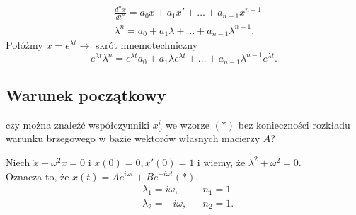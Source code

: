 \documentclass[../main.tex]{subfiles}
\begin{document}
\begin{przyklad}
\begin{align*}
                \\
                &\frac{d^nx}{dt^n} = a_0x + a_1x' + \ldots + a_{n-1}x^{n-1}\\
                &\lambda^n = a_0+a_1\lambda+\ldots+a_{n-1}\lambda^{n-1}
            .\end{align*}
            Połóżmy $x = e^{\lambda t}\to$ skrót mnemotechniczny\\
            \[
            e^{\lambda t}\lambda^n = e^{\lambda t}a_0 + a_1 \lambda e^{\lambda t} + \ldots + a_{n-1}\lambda^{n-1}e^{\lambda t}
            .\]
        \end{przyklad}

        \subsection{Warunek początkowy}
        czy można znaleźć współczynniki $x_0^i$ we wzorze $(*)$ bez konieczności rozkładu warunku brzegowego w bazie wektorów własnych macierzy $A$?
        \begin{przyklad}
            Niech $\ddot{x} + \omega^2 x = 0$ i $x(0) = 0, x'(0) = 1$ i wiemy, że $\lambda^2 + \omega^2 = 0$.\\
            Oznacza to, że $x(t) = A e^{i\omega t} + B e^{-i\omega t}(*)$,
            \begin{align*}
                &\lambda_1 = i\omega, &&n_1 = 1\\
                &\lambda_2 = -i\omega, &&n_2 = 1
            .\end{align*}
        \end{przyklad}
\end{document}
